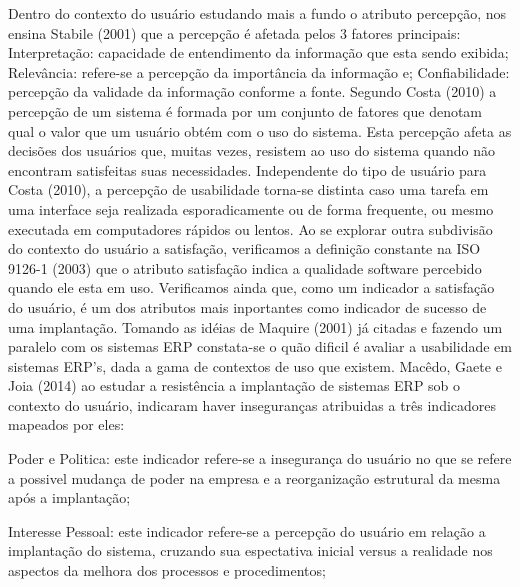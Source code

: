 \indent Dentro do contexto do usuário estudando mais a fundo o atributo percepção, nos ensina Stabile (2001) que a percepção é afetada pelos 3 fatores principais:  Interpretação: capacidade de entendimento da informação que esta sendo exibida; Relevância: refere-se a percepção da importância da informação e; Confiabilidade: percepção da validade da informação conforme a fonte.\newline
\indent Segundo Costa (2010) a percepção de um sistema é formada por um conjunto de fatores que denotam qual o valor que um usuário obtém com o uso do sistema. Esta percepção afeta as decisões dos usuários que, muitas vezes, resistem ao uso do sistema quando não encontram satisfeitas suas necessidades.\newline
\indent Independente do tipo de usuário para Costa (2010), a percepção de usabilidade torna-se distinta caso uma tarefa em uma interface seja realizada esporadicamente ou de forma frequente, ou mesmo executada em computadores rápidos ou lentos.\newline
\indent Ao se explorar outra subdivisão do contexto do usuário a satisfação, verificamos a definição constante na ISO 9126-1 (2003) que o atributo satisfação indica a qualidade software percebido quando ele esta em uso. Verificamos ainda que, como um indicador a satisfação do usuário, é um dos atributos mais inportantes como indicador de sucesso de uma implantação.\newline
\indent Tomando as idéias de Maquire (2001) já citadas e fazendo um paralelo com os sistemas  ERP constata-se o quão dificil é avaliar a usabilidade em sistemas ERP’s, dada a gama de contextos de uso que existem.\newline
\indent Macêdo, Gaete e Joia (2014) ao estudar a resistência a implantação de sistemas ERP sob o contexto do usuário,  indicaram haver inseguranças atribuidas a três indicadores mapeados por eles:
	\begin{flushright}
	\begin{minipage}{.955\textwidth}
		Poder e Politica: este indicador refere-se a insegurança do usuário no que se refere a possivel mudança de poder na empresa e a reorganização estrutural da mesma após a implantação;
	\end{minipage}
	\end{flushright}

	\begin{flushright}
	\begin{minipage}{.955\textwidth}
		Interesse Pessoal: este indicador refere-se a percepção do usuário em relação a implantação do sistema, cruzando sua espectativa inicial versus a realidade nos aspectos da melhora dos processos e procedimentos;
	\end{minipage}
	\end{flushright}
	
